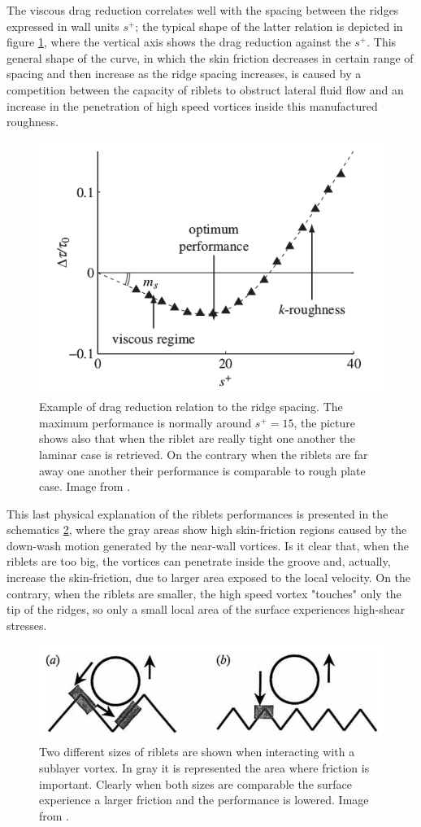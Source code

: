 The viscous drag reduction correlates well with the spacing between the ridges expressed in wall units $ s^+ $; the typical shape of the latter relation is depicted in figure \ref{fig:riblets_perf}, where the vertical axis shows the drag reduction against the $ s^+ $.
This general shape of the curve, in which the skin friction decreases in certain range of spacing and then increase as the ridge spacing  increases, is caused by a competition between the capacity of riblets to obstruct lateral fluid flow and an increase in the penetration of high speed vortices inside this manufactured roughness.

\begin{figure}[h]
	\centering
	\includegraphics[width=0.5\linewidth]{chapter_1/riblets_performance}
	\caption{Example of drag reduction relation to the ridge spacing. The maximum performance is normally around $ s^+ = 15 $, the picture shows also that when the riblet are really tight one another the laminar case is retrieved. On the contrary when the riblets are far away one another their performance is comparable to rough plate case. Image from \citet{jimenez2001turbulent}. }
	\label{fig:riblets_perf}
\end{figure}

This last physical explanation of the riblets performances is presented in the schematics \ref{fig:riblets_schem}, where the gray areas show high skin-friction regions caused by the down-wash motion generated by the near-wall vortices.
Is it clear that, when the riblets are too big, the vortices can penetrate inside the groove and, actually, increase the skin-friction, due to larger area exposed to the local velocity.
On the contrary, when the riblets are smaller, the high speed vortex "touches" only the tip of the ridges, so only a small local area of the surface experiences high-shear stresses.

\begin{figure}[h]
	\centering
	\includegraphics[width=0.7\linewidth]{chapter_1/riblets1}
	\caption{Two different sizes of riblets are shown when interacting with a sublayer vortex. In gray it is represented the area where friction is important. Clearly when both sizes are comparable the surface experience a larger friction and the performance is lowered. Image from \citet{choi1993direct}.}
	\label{fig:riblets_schem}
\end{figure}

